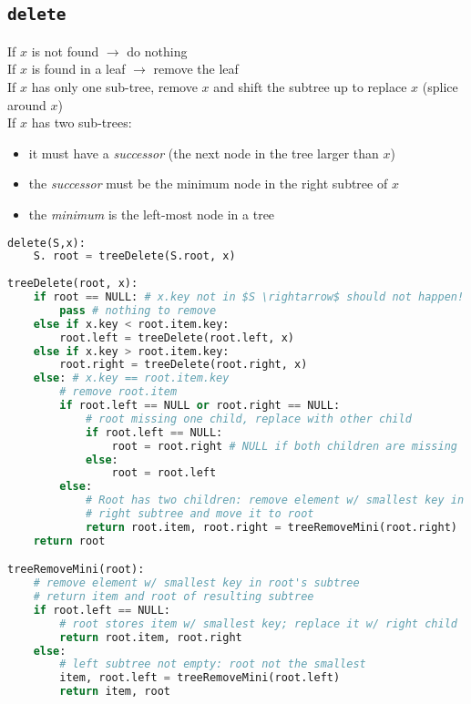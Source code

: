 \newpage
\subsection*{\texttt{delete}}

\noindent If $x$ is not found $\rightarrow$ do nothing \\
If $x$ is found in a leaf $\rightarrow$ remove the leaf \\
If $x$ has only one sub-tree, remove $x$ and shift the subtree up to replace $x$ (splice around $x$) \\
If $x$ has two sub-trees:
\begin{itemize}
	\item it must have a \textit{successor} (the next node in the tree larger than $x$)
	\item the \textit{successor} must be the minimum node in the right subtree of $x$
	\item the \textit{minimum} is the left-most node in a tree
\end{itemize}

\begin{lstlisting}[language=Python,mathescape]
delete(S,x):
	S. root = treeDelete(S.root, x)
	
treeDelete(root, x):
	if root == NULL: # x.key not in $S \rightarrow$ should not happen!
		pass # nothing to remove
	else if x.key < root.item.key:
		root.left = treeDelete(root.left, x)
	else if x.key > root.item.key:
		root.right = treeDelete(root.right, x)
	else: # x.key == root.item.key
		# remove root.item
		if root.left == NULL or root.right == NULL:
			# root missing one child, replace with other child
			if root.left == NULL:
				root = root.right # NULL if both children are missing
			else:
				root = root.left
		else:
			# Root has two children: remove element w/ smallest key in
			# right subtree and move it to root
			return root.item, root.right = treeRemoveMini(root.right)
	return root

treeRemoveMini(root):
	# remove element w/ smallest key in root's subtree
	# return item and root of resulting subtree
	if root.left == NULL:
		# root stores item w/ smallest key; replace it w/ right child
		return root.item, root.right
	else:
		# left subtree not empty: root not the smallest
		item, root.left = treeRemoveMini(root.left)
		return item, root
\end{lstlisting}

